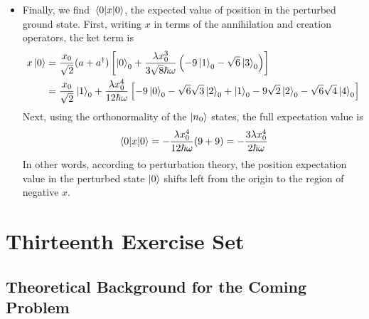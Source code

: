 \documentclass[11pt, a4paper]{article}
\begin{document}
\begin{itemize}
	\item Finally, we find $ \mel{0}{x}{0} $, the expected value of position in the perturbed ground state. First, writing $ x $ in terms of the annihilation and creation operators, the ket term is
	\begin{align*}
		x\ket{0} &= \frac{x_{0}}{\sqrt{2}}(a + a^{\dagger})\left[ \ket{0}_{0} + \frac{\lambda x_{0}^{3}}{3\sqrt{8}\hbar\omega}\left(-9\ket{1}_{0} - \sqrt{6}\ket{3}_{0}\right)\right]\\
		&= \frac{x_{0}}{\sqrt{2}}\ket{1}_{0} + \frac{\lambda x_{0}^{4}}{12\hbar \omega} \left[-9 \ket{0}_{0} - \sqrt{6} \sqrt{3}\ket{2}_{0} + \ket{1}_{0} - 9 \sqrt{2}\ket{2}_{0} - \sqrt{6}\sqrt{4}\ket{4}_{0}\right]
	\end{align*}
	Next, using the orthonormality of the $ \ket{n_{0}} $ states, the full expectation value is
	\begin{equation*}
		\mel{0}{x}{0} = -\frac{\lambda x_{0}^{4}}{12 \hbar \omega}(9 + 9) = -\frac{3\lambda x_{0}^{4}}{2 \hbar \omega}
	\end{equation*}
	In other words, according to perturbation theory, the position expectation value in the perturbed state $ \ket{0} $ shifts left from the origin to the region of negative $ x $. 
	

	
\end{itemize}

\section{Thirteenth Exercise Set}

\subsection{Theoretical Background for the Coming Problem}
\end{document}
